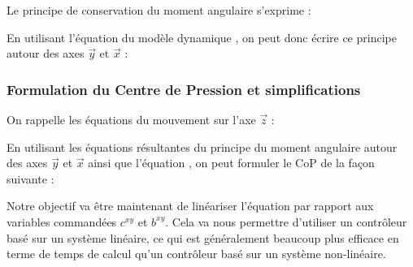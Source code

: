 				Le principe de conservation du moment angulaire s'exprime :
				
				En utilisant l'équation du modèle dynamique , on peut donc écrire ce principe autour des axes $\vec{y}$ et $\vec{x}$ :
				
			\subsubsection{Formulation du Centre de Pression et simplifications}
			
				On rappelle les équations du mouvement sur l'axe $\vec{z}$  :
			
				En utilisant les équations résultantes du principe du moment angulaire autour des axes $\vec{y}$ et $\vec{x}$  ainsi que l'équation , on peut formuler le CoP de la façon suivante :	
				
				Notre objectif va être maintenant de linéariser l'équation  par rapport aux variables commandées $c^{xy}$ et $b^{xy}$.
				Cela va nous permettre d'utiliser un contrôleur basé sur un système linéaire, ce qui est généralement beaucoup plus efficace en terme de temps de calcul qu'un contrôleur basé sur un système non-linéaire.
				
